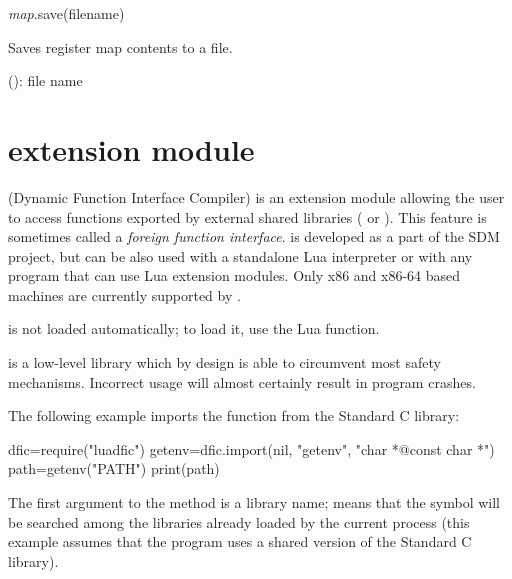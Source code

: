 \documentclass[a4paper,12pt,twoside,extrafontsizes]{memoir}
\begin{document}

\begin{luafuncprototype}
\emph{map}.save(filename)
\end{luafuncprototype}

\begin{funcdescr}
	Saves register map contents to a file.
\end{funcdescr}

\begin{funcparams}
	 (): file name
\end{funcparams}

\section[luadfic extension module]{ extension module}

 (Dynamic Function Interface Compiler) is an extension module allowing the user to access functions exported by external shared libraries ( or ). This feature is sometimes called a \emph{foreign function interface}.  is developed as a part of the SDM project, but can be also used with a standalone Lua interpreter or with any program that can use Lua extension modules. Only x86 and x86-64 based machines are currently supported by .

 is not loaded automatically; to load it, use the  Lua function.

 is a low-level library which by design is able to circumvent most safety mechanisms. Incorrect usage will almost certainly result in program crashes.

The following example imports the  function from the Standard C library:

\begin{shellcmds}\begin{luacode}
dfic=require("luadfic")
getenv=dfic.import(nil, "getenv", "char *@const char *")
path=getenv("PATH")
print(path)
\end{luacode}\end{shellcmds}

The first argument to the  method is a library name;  means that the symbol will be searched among the libraries already loaded by the current process (this example assumes that the program uses a shared version of the Standard C library).
\end{document}
